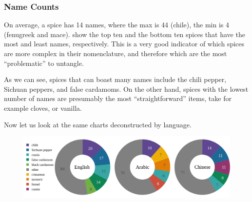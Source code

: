 \subsubsection{Name Counts}

On average, a spice has 14 names, where the max is 44 (chile), the min is 4 (fenugreek and mace).  show the top ten and the bottom ten spices that have the most and least names, respectively. This is a very good indicator of which spices are more complex in their nomenclature, and therefore which are the most ``problematic'' to untangle.

\begin{figure}[!ht]
	\centering
	\hfill
	\caption[]{}
	\label{fig:ids_top_and_bottom}
\end{figure}

As we can see, spices that can boast many names include the chili pepper, Sichuan peppers, and false cardamoms. On the other hand, spices with the lowest number of names are presumably the most ``straightforward'' items, take for example cloves, or vanilla.

Now let us look at the same charts deconstructed by language. 

\begin{figure}[!ht]
	\centering
	\includegraphics[width=\linewidth]{imgs/plots/ids_trio.pdf}
	\caption[]{}
	\label{fig:ids_top_and_bottom}
\end{figure}



